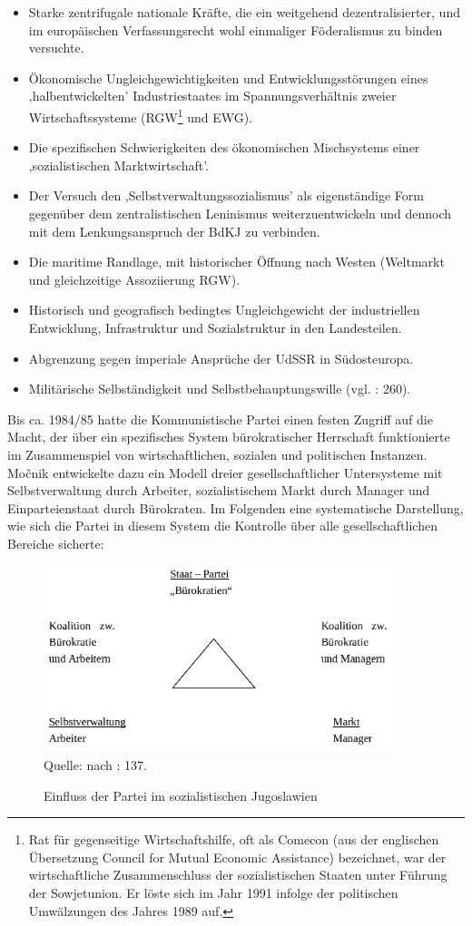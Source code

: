 \begin{itemize}
\item Starke zentrifugale nationale Kräfte, die ein weitgehend dezentralisierter, und im europäischen Verfassungsrecht wohl einmaliger Föderalismus zu binden versuchte.
\item Ökonomische Ungleichgewichtigkeiten und Entwicklungsstörungen eines ‚halbentwickelten’ Industriestaates im Spannungsverhältnis zweier Wirtschaftssysteme (RGW\footnote{Rat für gegenseitige Wirtschaftshilfe, oft als Comecon (aus der englischen Übersetzung Council for Mutual Economic Assistance) bezeichnet, war der wirtschaftliche Zusammenschluss der sozialistischen Staaten unter Führung der Sowjetunion. Er löste sich im Jahr 1991 infolge der politischen Umwälzungen des Jahres 1989 auf.} und EWG).
\item Die spezifischen Schwierigkeiten des ökonomischen Mischsystems einer ‚sozialistischen Marktwirtschaft’.
\item Der Versuch den ‚Selbstverwaltungssozialismus’ als eigenständige Form gegenüber dem zentralistischen Leninismus weiterzuentwickeln und dennoch mit dem Lenkungsanspruch der BdKJ zu verbinden.
\item Die maritime Randlage, mit historischer Öffnung nach Westen (Weltmarkt und gleichzeitige Assoziierung RGW).
\item Historisch und geografisch bedingtes Ungleichgewicht der industriellen Entwicklung, Infrastruktur und Sozialstruktur in den Landesteilen.
\item Abgrenzung gegen imperiale Ansprüche der UdSSR in Südosteuropa.
\item Militärische Selbständigkeit und Selbstbehauptungswille (vgl. \cite{roggemann}: 260).
\end{itemize}
Bis ca. 1984/85 hatte die Kommunistische Partei einen festen Zugriff auf die Macht, der über ein spezifisches System bürokratischer Herrschaft funktionierte im Zusammenspiel von wirtschaftlichen, sozialen und politischen Instanzen. Močnik entwickelte dazu ein Modell dreier gesellschaftlicher Untersysteme mit Selbstverwaltung durch Arbeiter, sozialistischem Markt durch Manager und Einparteienstaat durch Bürokraten. Im Folgenden eine systematische Darstellung, wie sich die Partei in diesem System die Kontrolle über alle gesellschaftlichen Bereiche sicherte:
\begin{figure}[H]
\setlength\belowcaptionskip{10pt}
 \caption{Einfluss der Partei im sozialistischen Jugoslawien}
  \centering
  \includegraphics[width=4in]{Material/Parteienbuerokratie}\\
\vspace{0,5cm}
Quelle: nach \cite{mocnik}: 137.
\end{figure}

